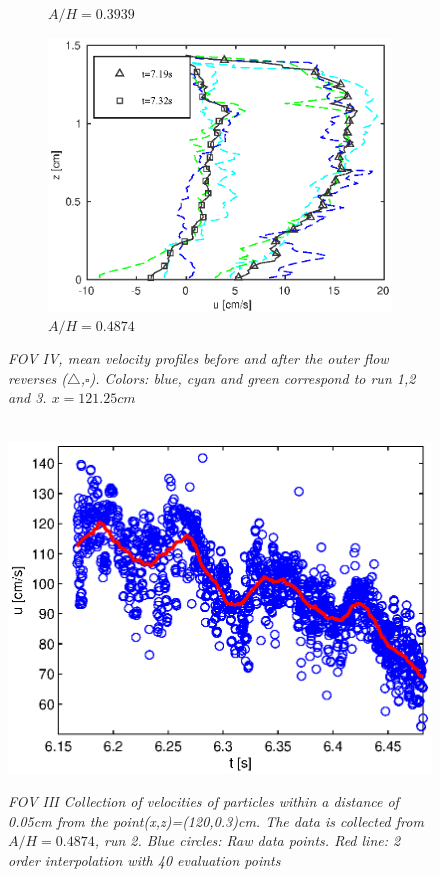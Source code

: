 \documentclass[a4paper, 11pt, english, twoside, openright]{article}
\begin{document}
\begin{figure}[]
{\begin{subfigure}[b]{.3\textwidth}
\caption{\textit{$A/H=0.3939$}}
\end{subfigure}%
\begin{subfigure}[b]{.3\textwidth}
\centering
\includegraphics[width=.95\textwidth]{./Figures/FOV_6/PIV_FOV6_case50.eps}
\caption{\textit{$A/H=0.4874$}}
\end{subfigure}%
}
\caption{\textit{FOV IV, mean velocity profiles before and after the outer flow reverses ($\triangle$,$\square$). Colors: blue, cyan and green correspond to run 1,2 and 3. 
$x=121.25cm$} }
\label{fig:PIV_FOV6}
\end{figure}
\begin{figure}[]
        \centering
        ~ %
                \includegraphics[scale=0.6]{./Figures/tid_case50_run2.eps}
                \caption{\textit{FOV III Collection of velocities of particles within a distance of 0.05cm from the point(x,z)=(120,0.3)cm. The data is collected from  $A/H=0.4874$, run 2. Blue circles: Raw data points. Red line: 2 order interpolation with 40 evaluation points}}
                \label{fig:wave_in_time}
        \end{figure}      
         
\end{document}
